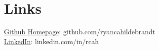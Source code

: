 \documentclass[letterpaper]{deedy-resume_sm} %
\begin{document}
\section{Links} 
\href{https://github.com/ryancahildebrandt}{Github Homepage}: github.com/ryancahildebrandt \\
\href{https://linkedin.com/in/rcah}{LinkedIn}: linkedin.com/in/rcah \\
\hfill



\end{document}
